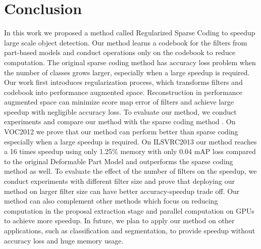 \chapter{Conclusion}
\label{c:conc}

In this work we proposed a method called Regularized Sparse Coding to speedup large scale object detection. Our method learns a codebook for the filters from part-based models and conduct operations only on the codebook to reduce computation. The original sparse coding method has accuracy loss problem when the number of classes grows larger, especially when a large speedup is required. Our work first introduces regularization process, which transforms filters and codebook into performance augmented space. Reconstruction in performance augmented space can minimize score map error of filters and achieve large speedup with negligible accuracy loss. To evaluate our method, we conduct experiments and compare our method with the sparse coding method \cite{song2012sparselet}. On VOC2012 we prove that our method can perform better than sparse coding especially when a large speedup is required. On ILSVRC2013 our method reaches a 16 times speedup using only 1.25\% memory with only 0.04 mAP loss compared to the original Deformable Part Model and outperforms the sparse coding method as well. To evaluate the effect of the number of filters on the speedup, we conduct experiments with different filter size and prove that deploying our method on larger filter size can have better accuracy-speedup trade off. Our method can also complement other methods which focus on reducing computation in the proposal extraction stage and parallel computation on GPUs to achieve more speedup. In future, we plan to apply our method on other applications, such as classification and segmentation, to provide speedup without accuracy loss and huge memory usage.
